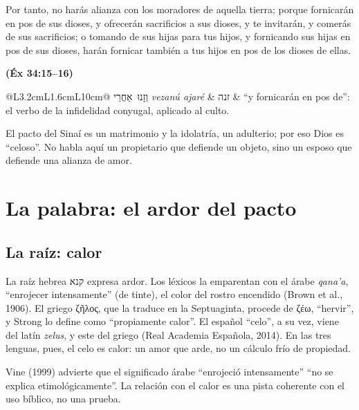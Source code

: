 \documentclass[11pt,letterpaper]{article}
\newcommand{\heb}[1]{\mbox{\foreignlanguage{hebrew}{#1}}}
\newcommand{\grc}[1]{\foreignlanguage{ancientgreek}{#1}}
\newcommand{\fuente}[1]{\par\hfill{\upshape\bfseries\small\textcolor{azul}{#1}}}
\begin{document}
\begin{cita}Por tanto, no harás alianza con los moradores de aquella tierra; porque fornicarán en pos de sus dioses, y ofrecerán sacrificios a sus dioses, y te invitarán, y comerás de sus sacrificios; o tomando de sus hijas para tus hijos, y fornicando sus hijas en pos de sus dioses, harán fornicar también a tus hijos en pos de los dioses de ellas.\fuente{(Éx 34:15--16)}\end{cita}

\begin{filologia}[Éx 34:15]
\begin{tabular}{@{}L{3.2cm}L{1.6cm}L{10cm}@{}}
\heb{וְזָנוּ אַחֲרֵי} \emph{vezanú ajaré} & \heb{זנה} & ``y fornicarán en pos de'': el verbo de la infidelidad conyugal, aplicado al culto. \\
\end{tabular}
\end{filologia}

El pacto del Sinaí es un matrimonio y la idolatría, un adulterio; por eso Dios es ``celoso''. No habla aquí un propietario que defiende un objeto, sino un esposo que defiende una alianza de amor.

\section{La palabra: el ardor del pacto}

\subsection{La raíz: calor}
La raíz hebrea \heb{קנא} expresa ardor. Los léxicos la emparentan con el árabe \emph{qana'a}, ``enrojecer intensamente'' (de tinte), el color del rostro encendido (Brown et al., 1906). El griego \grc{ζῆλος}, que la traduce en la Septuaginta, procede de \grc{ζέω}, ``hervir'', y Strong lo define como ``propiamente calor''. El español ``celo'', a su vez, viene del latín \emph{zelus}, y este del griego (Real Academia Española, 2014). En las tres lenguas, pues, el celo es calor: un amor que arde, no un cálculo frío de propiedad.

\begin{nota}[Precisión]
Vine (1999) advierte que el significado árabe ``enrojeció intensamente'' ``no se explica etimológicamente''. La relación con el calor es una pista coherente con el uso bíblico, no una prueba.
\end{nota}
\end{document}
